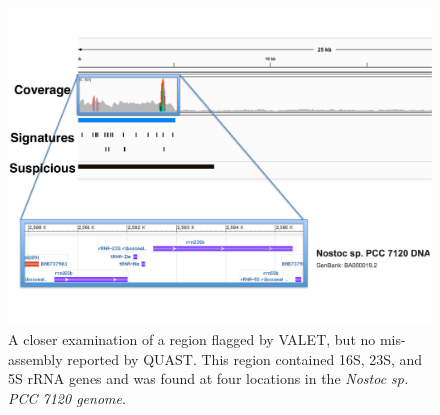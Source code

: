 \documentclass{article}
\begin{document}
\begin{figure}[tb!]
\begin{center}
\includegraphics[width=\textwidth]{figures/rrna_coverages}
\end{center}
\caption[16S_rrna]{A closer examination of a region flagged by VALET, but no mis-assembly reported by QUAST. This region contained 16S, 23S, and 5S rRNA genes and was found at four locations in the \emph{Nostoc sp. PCC 7120 genome}.}
\label{fig:rrna_coverages}
\end{figure}








%


\end{document}
